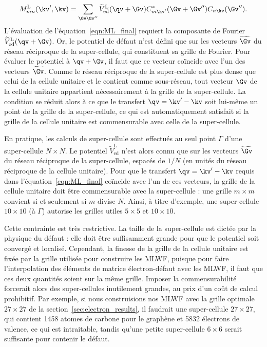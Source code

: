 \begin{equation}
    M_{mn}^\text{L}(\kv',\kv) = \sum_{\Gv\Gv''}\widetilde{V}_\text{ed}^\text{L}(\qv+\Gv)C_{m\kv'}^*(\Gv+\Gv'')C_{n\kv}(\Gv'').\label{eqn:ML_final}
\end{equation}
L'évaluation de l'équation~\eqref{eqn:ML_final} requiert la composante de Fourier $\widetilde{V}_\text{ed}^\text{L}(\qv+\Gv)$. Or, le potentiel de défaut n'est défini que sur les vecteurs $\widetilde{\Gv}$ du réseau réciproque de la super-cellule, qui constituent sa grille de Fourier. Pour évaluer le potentiel à $\qv+\Gv$, il faut que ce vecteur coïncide avec l'un des vecteurs $\widetilde{\Gv}$. Comme le réseau réciproque de la super-cellule est plus dense que celui de la cellule unitaire et le contient comme sous-réseau, tout vecteur $\Gv$ de la cellule unitaire appartient nécessairement à la grille de la super-cellule. La condition se réduit alors à ce que le transfert $\qv=\kv'-\kv$ soit lui-même un point de la grille de la super-cellule, ce qui est automatiquement satisfait si la grille de la cellule unitaire est commensurable avec celle de la super-cellule.

En pratique, les calculs de super-cellule sont effectués au seul point $\Gamma$ d'une super-cellule $N\times N$. Le potentiel $\widetilde{V}_\text{ed}^\text{L}$ n'est alors connu que sur les vecteurs $\widetilde{\Gv}$ du réseau réciproque de la super-cellule, espacés de $1/N$ (en unités du réseau réciproque de la cellule unitaire). Pour que le transfert $\qv=\kv'-\kv$ requis dans l'équation~\eqref{eqn:ML_final} coïncide avec l'un de ces vecteurs, la grille de la cellule unitaire doit être commensurable avec la super-cellule : une grille $m\times m$ convient si et seulement si $m$ divise $N$. Ainsi, à titre d'exemple, une super-cellule $10\times 10$ (à $\Gamma$) autorise les grilles utiles $5\times 5$ et $10\times 10$.

Cette contrainte est très restrictive. La taille de la super-cellule est dictée par la physique du défaut : elle doit être suffisamment grande pour que le potentiel soit convergé et localisé. Cependant, la finesse de la grille de la cellule unitaire est fixée par la grille utilisée pour construire les MLWF, puisque pour faire l'interpolation des éléments de matrice électron-défaut avec les MLWF, il faut que ces deux quantités soient sur la même grille. Imposer la commensurabilité forcerait alors des super-cellules inutilement grandes, au prix d'un coût de calcul prohibitif. Par exemple, si nous construisions nos MLWF avec la grille optimale $27\times 27$ de la section~\ref{sec:electron_results}, il faudrait une super-cellule $27\times 27$, qui contient 1458 atomes de carbone pour le graphène et 5832 électrons de valence, ce qui est intraitable, tandis qu'une petite super-cellule $6\times 6$ serait suffisante pour contenir le défaut.

